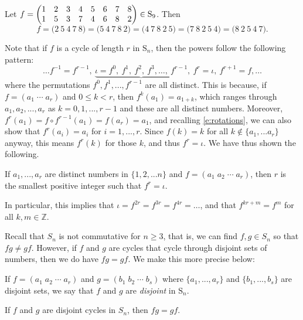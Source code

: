 \documentclass[11pt,dvipsnames]{book}
\numberwithin{figure}{section} %
\numberwithin{table}{section} %
\begin{document}
\begin{example}
Let $f=\left(\begin{matrix} %
1 & 2 & 3 & 4 & 5 & 6 & 7 & 8 \cr%
1 & 5 & 3 & 7 & 4 & 6 & 8 & 2 \cr%
\end{matrix}\right)\in\mathrm{S}_{9}$.  Then
$$
f=\big(2\ 5\ 4\ 7\ 8\big)=\big(5\ 4\ 7\ 8\ 2\big)=\big(4\ 7\ 8\ 2\ 5\big)=\big(7\ 8\ 2\ 5\ 4\big)=\big(8\ 2\ 5\ 4\ 7\big).%
$$
\end{example}



Note that if $f$ is a cycle of length $r$ in $\mathrm{S}_n$, 
 then the powers follow the following pattern:
$$
\ldots f^{-1}=f^{r-1},\  \underbrace{\iota=f^{0},\ f^{1},\ f^{2},\ f^{3},\ldots,\ f^{r-1}},\  f^{r}=\iota,\  f^{r+1}=f,  \ldots%
$$
where the permutations $f^{0},f^{1},...,f^{r-1}$ are all distinct. This is because, if $f=(a_{1}\; \cdots \; a_{r})$ and $0\leq  k < r$, then $f^{k}(a_{1})=a_{1+k}$, which ranges through $a_{1},a_{2},...,a_{r}$ as $k=0,1,...,r-1$ and these are all distinct numbers. Moreover, $f^{r}(a_{1})=f\circ f^{r-1}(a_{1})=f(a_{r})=a_{1}$, and recalling \eqref{e:rotations}, we can also show that $f^{r}(a_{i})=a_{i}$ for $i=1,...,r$. Since $f(k)=k$ for all $k\not\in \{a_{1},...a_{r}\}$ anyway, this means $f^{r}(k)$ for those $k$, and thus $f^{r}=\iota$. We have thus shown the following.

 \begin{corollary}  If $a_{1},...,a_{r}$ are distinct numbers in $\{1,2,...n\}$ and $f=(a_{1}\; a_{2} \; \cdots \; a_{r})$, then $r$ is the smallest positive integer such
that $f^r=\iota$.
\end{corollary}

In particular, this implies that $\iota=f^{2r}=f^{3r}=f^{4r}=\ldots$, and that  $f^{kr+m}=f^{m}$ for all $k,m\in\mathbb{Z}$.

Recall that $S_{n}$ is not commutative for $n\geq 3$, that is, we can find $f,g\in S_{n}$ so that $fg\neq gf$. However, if $f$ and $g$ are cycles that cycle through disjoint sets of numbers, then we do have $fg=gf$. We make this more precise below:

\begin{definition}  If $f=(a_{1}\; a_{2}\; \cdots \; a_{r})$ and $g=(b_{1}\; b_{2}\; \cdots \; b_{s})$ where $\{a_{1},...,a_{r}\}$ and $\{b_{1},...,b_{s}\}$ are disjoint sets, we say that $f$ and $g$ are {\it disjoint} in $\mathrm{S}_{n}$.
\end{definition}

\begin{proposition}
If $f$ and $g$ are disjoint cycles in $S_{n}$, then $fg=gf$. 
\end{proposition}
\end{document}
